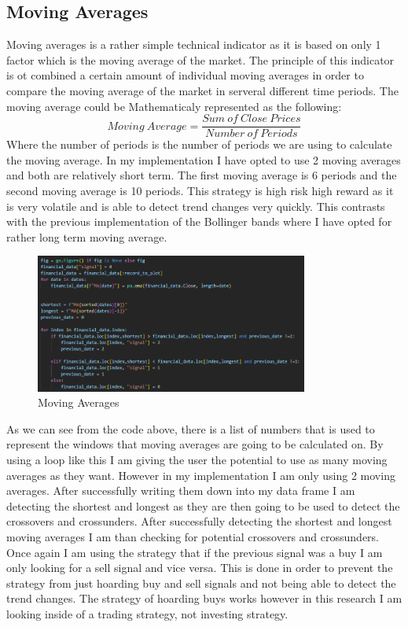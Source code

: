 \documentclass{imc-inf}
\begin{document}
		\subsection{Moving Averages}
			Moving averages is a rather simple technical indicator as it is based on only 1 factor which is the moving average of the market. 
			The principle of this indicator is ot combined a certain amount of individual moving averages in order to compare the moving average of the market in serveral 
			different time periods. The moving average could be Mathematicaly represented as the following:
			\begin{equation}
				Moving\ Average = \frac{Sum\ of\ Close\ Prices}{Number\ of\ Periods}
			\end{equation}
			Where the number of periods is the number of periods we are using to calculate the moving average.
			In my implementation I have opted to use 2 moving averages and both are relatively short term. The first moving average is 6 periods and the second moving average is 10 periods.
			This strategy is high risk high reward as it is very volatile and is able to detect trend changes very quickly. This contrasts with the previous implementation of the 
			Bollinger bands where I have opted for rather long term moving average.
			\begin{figure}[h!]
				\centering
				\includegraphics[width=0.8\textwidth]{moving_averages_code.png}
				\caption{Moving Averages}
				\label{fig:moving_averages}

			\end{figure}

			As we can see from the code above, there is a list of numbers that is used to represent the windows that moving averages are going to be calculated on. 
			By using a loop like this I am giving the user the potential to use as many moving averages as they want. However in my implementation I am only using 2 moving averages.
			After successfully writing them down into my data frame I am detecting the shortest and longest as they are then going to be used to detect the crossovers and crossunders.
			After successfully detecting the shortest and longest moving averages I am than checking for potential crossovers and crossunders. Once again
			I am using the strategy that if the previous signal was a buy I am only looking for a sell signal and vice versa. This is done in order to prevent the strategy from just hoarding 
			buy and sell signals and not being able to detect the trend changes. The strategy of hoarding buys works however in this research I am looking inside of
			a trading strategy, not investing strategy.
\end{document}
